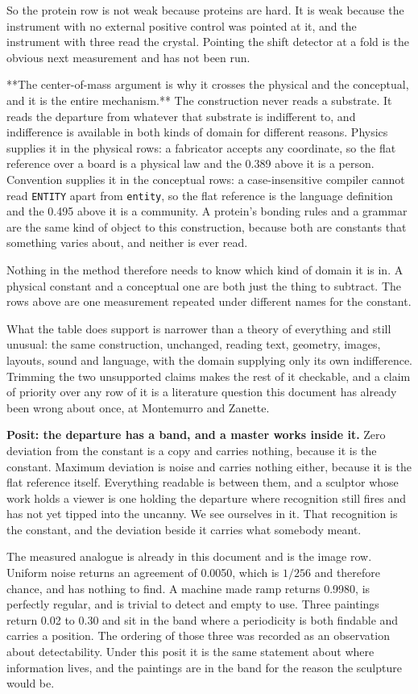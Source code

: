 So the protein row is not weak because proteins are hard. It is weak because the instrument with no external positive control was pointed at it, and the instrument with three read the crystal. Pointing the shift detector at a fold is the obvious next measurement and has not been run.

**The center-of-mass argument is why it crosses the physical and the conceptual, and it is the entire mechanism.** The construction never reads a substrate. It reads the departure from whatever that substrate is indifferent to, and indifference is available in both kinds of domain for different reasons. Physics supplies it in the physical rows: a fabricator accepts any coordinate, so the flat reference over a board is a physical law and the 0.389 above it is a person. Convention supplies it in the conceptual rows: a case-insensitive compiler cannot read \texttt{ENTITY} apart from \texttt{entity}, so the flat reference is the language definition and the 0.495 above it is a community. A protein's bonding rules and a grammar are the same kind of object to this construction, because both are constants that something varies about, and neither is ever read.

Nothing in the method therefore needs to know which kind of domain it is in. A physical constant and a conceptual one are both just the thing to subtract. The rows above are one measurement repeated under different names for the constant.

What the table does support is narrower than a theory of everything and still unusual: the same construction, unchanged, reading text, geometry, images, layouts, sound and language, with the domain supplying only its own indifference. Trimming the two unsupported claims makes the rest of it checkable, and a claim of priority over any row of it is a literature question this document has already been wrong about once, at Montemurro and Zanette.

\textbf{Posit: the departure has a band, and a master works inside it.} Zero deviation from the constant is a copy and carries nothing, because it is the constant. Maximum deviation is noise and carries nothing either, because it is the flat reference itself. Everything readable is between them, and a sculptor whose work holds a viewer is one holding the departure where recognition still fires and has not yet tipped into the uncanny. We see ourselves in it. That recognition is the constant, and the deviation beside it carries what somebody meant.

The measured analogue is already in this document and is the image row. Uniform noise returns an agreement of 0.0050, which is \(1/256\) and therefore chance, and has nothing to find. A machine made ramp returns 0.9980, is perfectly regular, and is trivial to detect and empty to use. Three paintings return 0.02 to 0.30 and sit in the band where a periodicity is both findable and carries a position. The ordering of those three was recorded as an observation about detectability. Under this posit it is the same statement about where information lives, and the paintings are in the band for the reason the sculpture would be.

